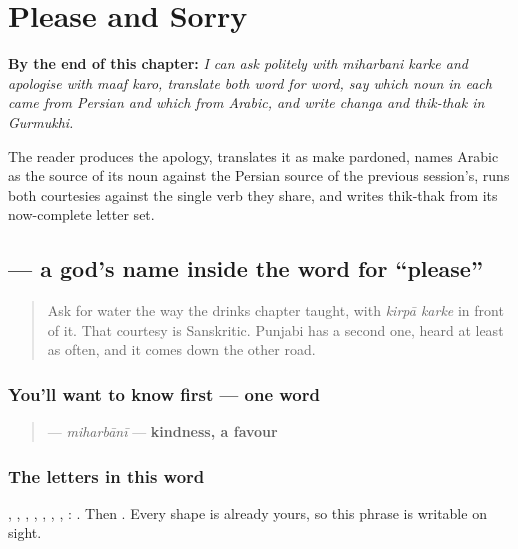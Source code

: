 
\chapter{Please and Sorry}
\label{ch:pa-please-and-sorry}

\begin{chapteropening}
\textbf{By the end of this chapter:} \emph{I can ask politely with miharbani karke and apologise with maaf karo, translate both word for word, say which noun in each came from Persian and which from Arabic, and write changa and thik-thak in Gurmukhi.}

The reader produces the apology, translates it as make pardoned, names Arabic as the source of its noun against the Persian source of the previous session's, runs both courtesies against the single verb they share, and writes thik-thak from its now-complete letter set.
\end{chapteropening}

\section[\texorpdfstring{\pa{ਮਿਹਰਬਾਨੀ} \pa{ਕਰਕੇ} (miharbānī karke)}{ਮਿਹਰਬਾਨੀ ਕਰਕੇ (miharbānī karke)}]{  — a god's name inside the word for \textquotedblleft{}please\textquotedblright{}}

\label{lesson:PA-C33-miharbani-karke}



\begin{quote}
Ask for water the way the drinks chapter taught, with \emph{kirpā karke} in front of it. That courtesy is Sanskritic. Punjabi has a second one, heard at least as often, and it comes down the other road.
\end{quote}

\subsection*{You'll want to know first — one word}
\begin{quote}
\textbf{} — \emph{miharbānī} — \textbf{kindness, a favour}
\end{quote}

\subsection*{The letters in this word}
\textbf{}, \textbf{}, \textbf{}, \textbf{}, \textbf{}, \textbf{}, \textbf{}, \textbf{}: \textbf{}. Then \textbf{}. Every shape is already yours, so this phrase is writable on sight.

